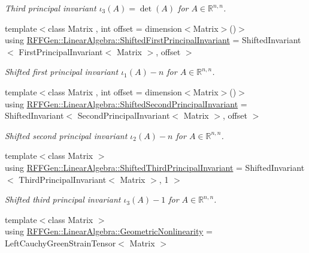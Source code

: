 \begin{DoxyCompactItemize}
\begin{DoxyCompactList}\small\item\em Third principal invariant $ \iota_3(A)=\det(A) $ for $A\in\mathbb{R}^{n,n}$. \end{DoxyCompactList}\item 
\hypertarget{group__LinearAlgebraGroup_ga7f9e376f62d3a241e6c2a7ffbbbcde11}{{\footnotesize template$<$class Matrix , int offset = dimension$<$\-Matrix$>$()$>$ }\\using \hyperlink{group__LinearAlgebraGroup_ga7f9e376f62d3a241e6c2a7ffbbbcde11}{R\-F\-F\-Gen\-::\-Linear\-Algebra\-::\-Shifted\-First\-Principal\-Invariant} = Shifted\-Invariant$<$ First\-Principal\-Invariant$<$ Matrix $>$, offset $>$}\label{group__LinearAlgebraGroup_ga7f9e376f62d3a241e6c2a7ffbbbcde11}

\begin{DoxyCompactList}\small\item\em Shifted first principal invariant $ \iota_1(A) - n $ for $ A\in\mathbb{R}^{n,n} $. \end{DoxyCompactList}\item 
\hypertarget{group__LinearAlgebraGroup_ga8b827036929c8a747d0e901cdddf2f70}{{\footnotesize template$<$class Matrix , int offset = dimension$<$\-Matrix$>$()$>$ }\\using \hyperlink{group__LinearAlgebraGroup_ga8b827036929c8a747d0e901cdddf2f70}{R\-F\-F\-Gen\-::\-Linear\-Algebra\-::\-Shifted\-Second\-Principal\-Invariant} = Shifted\-Invariant$<$ Second\-Principal\-Invariant$<$ Matrix $>$, offset $>$}\label{group__LinearAlgebraGroup_ga8b827036929c8a747d0e901cdddf2f70}

\begin{DoxyCompactList}\small\item\em Shifted second principal invariant $ \iota_2(A) - n $ for $ A\in\mathbb{R}^{n,n} $. \end{DoxyCompactList}\item 
\hypertarget{group__LinearAlgebraGroup_gaa3670564453075521adb81bee7fa45e7}{{\footnotesize template$<$class Matrix $>$ }\\using \hyperlink{group__LinearAlgebraGroup_gaa3670564453075521adb81bee7fa45e7}{R\-F\-F\-Gen\-::\-Linear\-Algebra\-::\-Shifted\-Third\-Principal\-Invariant} = Shifted\-Invariant$<$ Third\-Principal\-Invariant$<$ Matrix $>$, 1 $>$}\label{group__LinearAlgebraGroup_gaa3670564453075521adb81bee7fa45e7}

\begin{DoxyCompactList}\small\item\em Shifted third principal invariant $ \iota_3(A) - 1 $ for $ A\in\mathbb{R}^{n,n} $. \end{DoxyCompactList}\item 
\hypertarget{group__LinearAlgebraGroup_ga435378ac8a773de0a3a8b3b8f67fee0c}{{\footnotesize template$<$class Matrix $>$ }\\using \hyperlink{group__LinearAlgebraGroup_ga435378ac8a773de0a3a8b3b8f67fee0c}{R\-F\-F\-Gen\-::\-Linear\-Algebra\-::\-Geometric\-Nonlinearity} = Left\-Cauchy\-Green\-Strain\-Tensor$<$ Matrix $>$}\label{group__LinearAlgebraGroup_ga435378ac8a773de0a3a8b3b8f67fee0c}


\end{DoxyCompactItemize}

